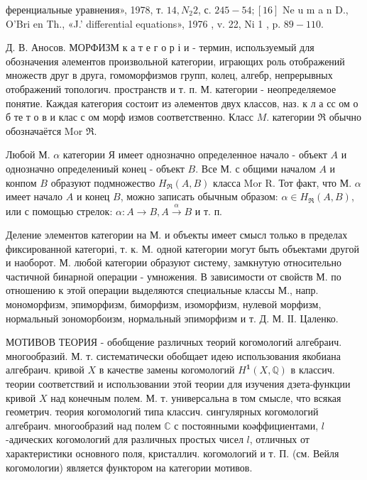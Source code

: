 \documentclass[10pt]{article}
\begin{document}
ференциальные уравнения», 1978, т. $14, N_{2} 2$, с. $245-54 ;[16]$ Ne u m a n D., O'Bri en Th., «J.' differential equations», 1976 , v. 22, Ni 1 , p. $89-110$.



Д. В. Аносов. МОРФИЗМ к а т е г о р і и - термин, используемый для обозначения әлементов произвольной категории, играющих роль отображений множеств друг в друга, гомоморфизмов групп, колец, алгебр, непрерывных отображений топологич. пространств и т. п. М. категории - неопределяемое понятие. Каждая категория состоит из әлементов двух классов, наз. к л а сс ом о б те т о в и клас с ом морф измов соответственно. Класс $M$. категории $\Re$ обычно обозначаётся Mor $\mathfrak{R}$.



Любой М. $\alpha$ категории Я имеет однозначно определенное начало - объект $A$ и однозначно определениый конец - объект $B$. Все М. с общими началом $A$ и конпом $B$ образуют подмножество $H_{\mathfrak{\Re}}(A, B)$ класса Mor R. Тот факт, что М. $\alpha$ имеет начало $A$ и конец $B$, можно записать обычным образом: $\alpha \in H_{\mathfrak{R}}(A, B)$, или с помощью стрелок: $\alpha: A \rightarrow B, A \stackrel{\alpha}{\rightarrow} B$ и т. п.



Деление элементов категории на М. и объекты имеет смысл только в пределах фиксированной категориі, т. к. М. одной категории могут быть объектами другой и наоборот. М. любой категории образуют систему, замкнутую относительно частичной бинарной операции - умножения. В зависимости от свойств М. по отношению к этой операции выделяются специальные классы М., напр. мономорфизм, эпиморфизм, биморфизм, изоморфизм, нулевой морфизм, нормальный зономорбоизм, нормальный эпиморфизм и т. Д. М. ІІ. Цаленко.



МОТИВОВ ТЕОРИЯ - обобщение различных теорий когомологий алгебраич. многообразий. М. т. систематически обобщает идею использования якобиана алгебраич. кривой $X$ в качестве замены когомологий $H^{\mathbf{1}}(X, \mathbb{Q})$ в классич. теории соответствий и использовании этой теории для изучения дзета-функции кривой $X$ над конечным полем. М. т. универсальна в том смысле, что всякая геометрич. теория когомологий типа классич. сингулярных когомологий алгебраич. многообразий над полем $\mathbb{C}$ с постоянными коәффициентами, $l$-адических когомологий для различных простых чисел $l$, отличных от характеристики основного поля, кристаллич. когомологий и т. П. (см. Вейля когомологии) является функтором на категории мотивов.
\end{document}
